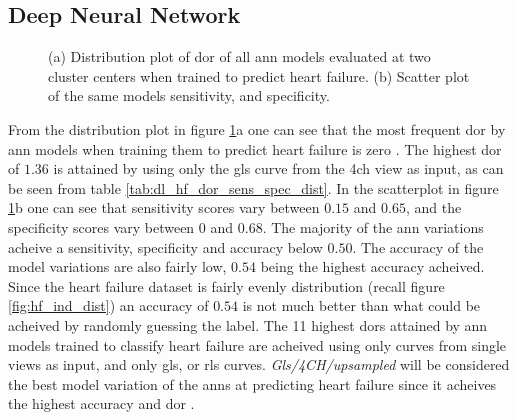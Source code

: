 \clearpage

\subsection{Deep Neural Network}

\begin{figure}[H]
    \centering
    
    \caption{(a) Distribution plot of \acrshort{dor} of all \acrshort{ann} models evaluated at two cluster centers when trained to predict heart failure.
             (b) Scatter plot of the same models sensitivity, and specificity.}
    \label{fig:dl_hf_dor_sens_spec_dist}
\end{figure}

From the distribution plot in figure \ref{fig:dl_hf_dor_sens_spec_dist}a one can see that the most frequent \acrshort{dor} by \acrshort{ann} models when training them to predict heart failure is zero .
The highest \acrshort{dor} of $1.36$ is attained by using only the \acrshort{gls} curve from the \acrshort{4ch} view as input, as can be seen from table \ref{tab:dl_hf_dor_sens_spec_dist}.
In the scatterplot in figure \ref{fig:dl_hf_dor_sens_spec_dist}b one can see that sensitivity scores vary between $0.15$ and $0.65$, and the specificity scores vary between $0$ and $0.68$.
The majority of the \acrshort{ann} variations acheive a sensitivity, specificity and accuracy below $0.50$.
The accuracy of the model variations are also fairly low, $0.54$ being the highest accuracy acheived.
Since the heart failure dataset is fairly evenly distribution (recall figure \ref{fig:hf_ind_dist}) an accuracy of $0.54$ is not much better than what could be acheived 
by randomly guessing the label. 
The 11 highest \acrshort{dor}s attained by \acrshort{ann} models trained to classify heart failure are acheived using only curves from single views as input, and only \acrshort{gls}, or \acrshort{rls} curves.
\textit{Gls/4CH/upsampled} will be considered the best model variation of the \acrshort{ann}s at predicting heart failure since it acheives the highest accuracy and \acrshort{dor} . \bigskip

